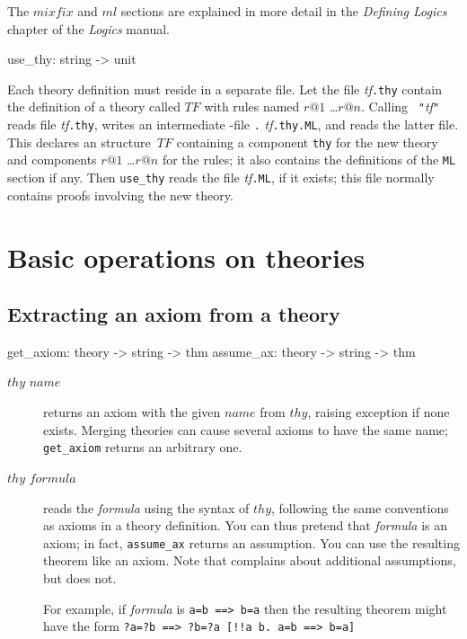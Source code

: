 The $mixfix$ and $ml$ sections are explained in more detail in the {\it
Defining Logics} chapter of the {\it Logics} manual.

\begin{ttbox} 
use_thy: string -> unit
\end{ttbox}
Each theory definition must reside in a separate file.  Let the file {\it
  tf}{\tt.thy} contain the definition of a theory called $TF$ with rules named
$r@1$ \dots $r@n$.  Calling ~{\tt"}{\it tf\/}{\tt"} reads
file {\it tf}{\tt.thy}, writes an intermediate {\ML}-file {\tt.}{\it
  tf}{\tt.thy.ML}, and reads the latter file.  This declares an {\ML}
structure~$TF$ containing a component {\tt thy} for the new theory
and components $r@1$ \dots $r@n$ for the rules; it also contains the
definitions of the {\tt ML} section if any.  Then {\tt use_thy}
reads the file {\it tf}{\tt.ML}, if it exists; this file normally contains
proofs involving the new theory.


\section{Basic operations on theories}
\subsection{Extracting an axiom from a theory}
\begin{ttbox} 
get_axiom: theory -> string -> thm
assume_ax: theory -> string -> thm
\end{ttbox}
\begin{description}
\item[ $thy$ $name$] 
returns an axiom with the given $name$ from $thy$, raising exception
 if none exists.  Merging theories can cause several axioms
to have the same name; {\tt get_axiom} returns an arbitrary one.

\item[ $thy$ $formula$] 
reads the {\it formula} using the syntax of $thy$, following the same
conventions as axioms in a theory definition.  You can thus pretend that
{\it formula} is an axiom; in fact, {\tt assume_ax} returns an assumption.
You can use the resulting theorem like an axiom.  Note that 
 complains about additional assumptions, but 
 does not.

For example, if {\it formula} is
\hbox{\tt a=b ==> b=a} then the resulting theorem might have the form
\hbox{\tt\frenchspacing ?a=?b ==> ?b=?a  [!!a b. a=b ==> b=a]}
\end{description}

